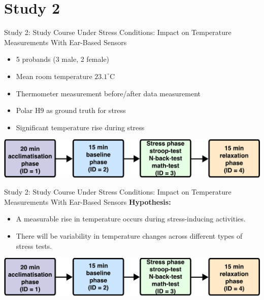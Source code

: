 \documentclass[en]{sdqbeamer}
\begin{document}
\section{Study 2}
\begin{frame}{Study 2: Study Course Under Stress Conditions: Impact on Temperature Measurements With Ear-Based Sensors}
    \begin{itemize}
        \item 5 probands (3 male, 2 female)
        \item Mean room temperature $23.1^\circ\text{C}$
        \item Thermometer measurement before/after data measurement
        \item Polar H9 as ground truth for stress
        \item Significant temperature rise during stress \cite{marazzitiPsychologicalStressBody1992, vinkersEffectStressCore2013}
    \end{itemize}
\begin{center}
  \includegraphics[width=0.95\linewidth]{../thesis-doc/images/study2/Procedure2_short.pdf}
\end{center}
\end{frame}

\begin{frame}{Study 2: Study Course Under Stress Conditions: Impact on Temperature Measurements With Ear-Based Sensors}
    \textbf{Hypothesis:}
    \begin{itemize}
        \item A measurable rise in temperature occurs during stress-inducing activities.
        \item There will be variability in temperature changes across different types of stress tests.
    \end{itemize}
\begin{center}
  \includegraphics[width=0.95\linewidth]{../thesis-doc/images/study2/Procedure2_short.pdf}
\end{center}
\end{frame}
\end{document}
